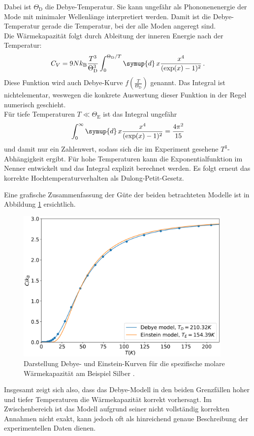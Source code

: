 Dabei ist $\Theta_\text{D}$ die Debye-Temperatur. Sie kann ungefähr als Phononenenergie der Mode mit minimaler Wellenlänge interpretiert werden. Damit ist die Debye-Temperatur gerade die Temperatur, bei der alle Moden angeregt sind.\\
Die Wärmekapazität folgt durch Ableitung der inneren Energie nach der Temperatur:
\begin{equation}
  C_V = 9 N k_\text{B} \frac{T^3}{\Theta_\text{D}^3}\int_0^{\Theta_\text{D}/T} \symup{d}\,x \frac{x^4}{(\exp(x)-1)^2}\,.
  \label{eqn:cVDebye}
\end{equation}
Diese Funktion wird auch Debye-Kurve $f\left(\frac{T}{\Theta_\text{D}}\right)$ genannt.
Das Integral ist nichtelementar, weswegen die konkrete Auswertung dieser Funktion in der Regel numerisch geschieht. \\
Für tiefe Temperaturen $T \ll \Theta_\text{E}$ ist das Integral ungefähr
\begin{equation}
  \int_0^{\infty} \symup{d}\,x \frac{x^4}{(\exp(x)-1)^2} = \frac{4\pi^2}{15}
  \label{eqn:theorieIntegral}
\end{equation}
und damit nur ein Zahlenwert, sodass sich die im Experiment gesehene $T^3$-Abhängigkeit ergibt. Für hohe Temperaturen kann die Exponentialfunktion im Nenner entwickelt und das Integral explizit berechnet werden. Es folgt erneut das korrekte Hochtemperaturverhalten als Dulong-Petit-Gesetz.

Eine grafische Zusammenfassung der Güte der beiden betrachteten Modelle ist in Abbildung \ref{fig:debyeEinstein} ersichtlich.

\begin{figure}
  \centering
  \includegraphics[width=300pt]{data/debyeEinsteinTheory.png}
  \caption{Darstellung Debye- und Einstein-Kurven für die spezifische molare Wärmekapazität am Beispiel Silber \cite{debyeEinstein}.}
  \label{fig:debyeEinstein}
\end{figure}

Insgesamt zeigt sich also, dass das Debye-Modell in den beiden Grenzfällen hoher und tiefer Temperaturen die Wärmekapazität korrekt vorhersagt. Im Zwischenbereich ist das Modell aufgrund seiner nicht vollständig korrekten Annahmen nicht exakt, kann jedoch oft als hinreichend genaue Beschreibung der experimentellen Daten dienen.
